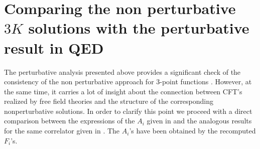 \documentclass[a4paper,11pt,openright,twoside]{book}
\numberwithin{equation}{section}
\begin{document}
{{\section{Comparing the non perturbative $3K$ solutions with the perturbative result in QED}
The perturbative analysis presented above provides a significant check of the consistency of the non perturbative approach for 3-point functions \cite{Bzowski:2013sza, Bzowski:2015yxv, Bzowski:2017poo}. However, at the same time, it carries a lot of insight about the connection between CFT's realized by free field theories and the structure of the corresponding nonperturbative solutions. In order to clarify this point we proceed 
with a direct comparison between the expressions of the $A_i$ given in \cite{Coriano:2018bbe} and the analogous results for the same correlator given in \cite{Bzowski:2013sza}. The $A_i$'s have been obtained by the recomputed $F_i$'s.

}}
\end{document}
